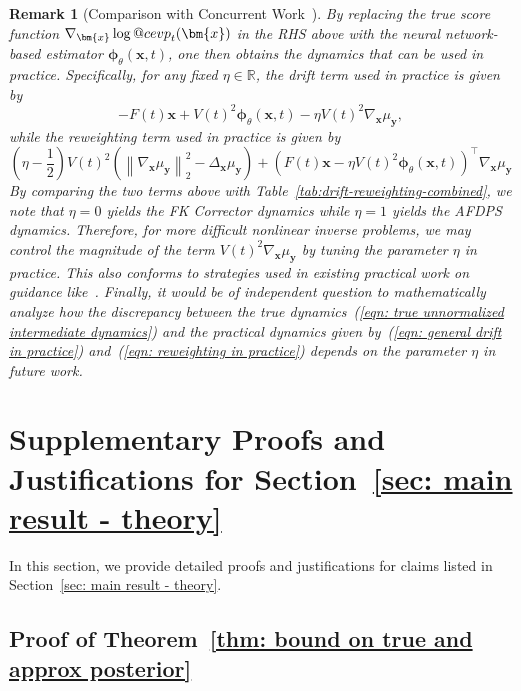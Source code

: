 \documentclass{article}
\makeatletter
\numberwithin{equation}{section}
\newtheorem{remark}[theorem]{Remark}
\def\eqref#1{(\ref{#1})}
\def\vx{{\bm{x}}}
\def\vy{{\bm{y}}}
\def\vphi{{\bm{\phi}}}
\DeclareRobustCommand{\cev}[1]{%
  {\mathpalette\do@cev{#1}}%
}
\newcommand{\do@cev}[2]{%
  \vbox{\offinterlineskip
    \sbox\z@{$\m@th#1 x$}%
    \ialign{##\cr
      \hidewidth\reflectbox{$\m@th#1\vec{}\mkern4mu$}\hidewidth\cr
      \noalign{\kern-\ht\z@}
      $\m@th#1#2$\cr
    }%
  }%
}
\makeatother
\begin{document}
\begin{remark}[Comparison with Concurrent Work~\cite{skreta2025feynman}]
    By replacing the true score function $\nabla_{\vx}\log \cev{p}_t(\vx)$ in the RHS above with the neural network-based estimator $\vphi_{\theta}(\vx,t)$, one then obtains the dynamics that can be used in practice. Specifically, for any fixed $\eta \in \mathbb{R}$, the drift term used in practice is given by
    \begin{equation}
    \label{eqn: general drift in practice}    
    -F(t)\vx + V(t)^2\vphi_{\theta}(\vx,t) - \eta V(t)^2\nabla_{\vx}\mu_{\vy},
    \end{equation}
    while the reweighting term used in practice is given by 
    \begin{equation}
    \label{eqn: reweighting in practice}
    \left(\eta - \frac{1}{2}\right)V(t)^2\left(\left\|\nabla_{\vx}\mu_{\vy}\right\|_2^2 - \Delta_{\vx}\mu_{\vy}\right) + \left(F(t)\vx -\eta V(t)^2 \vphi_{\theta}\left(\vx,t\right)\right)^\intercal\nabla_{\vx}\mu_{\vy} 
    \end{equation}
    By comparing the two terms above with Table~\ref{tab:drift-reweighting-combined}, we note that $\eta = 0$ yields the FK Corrector dynamics while $\eta = 1$ yields the AFDPS dynamics. Therefore, for more difficult nonlinear inverse problems, we may control the magnitude of the term $V(t)^2\nabla_{\vx}\mu_{\vy}$ by tuning the parameter $\eta$ in practice. This also conforms to strategies used in existing practical work on guidance like~\cite{dhariwal2021diffusion,ho2022classifier,bansal2023universal,song2023loss,he2023manifold,guo2024gradient,ye2024tfg}. Finally, it would be of independent question to mathematically analyze how the discrepancy between the true dynamics~\eqref{eqn: true unnormalized intermediate dynamics} and the practical dynamics given by~\eqref{eqn: general drift in practice} and~\eqref{eqn: reweighting in practice} depends on the parameter $\eta$ in future work.
\end{remark}


\section{Supplementary Proofs and Justifications for Section~\ref{sec: main result - theory}}
\label{sec: derivations for Sec 4}
In this section, we provide detailed proofs and justifications for claims listed in Section~\ref{sec: main result - theory}. 

\subsection{Proof of Theorem~\ref{thm: bound on true and approx posterior}}
\label{proof: posterior bound by prior error}
\end{document}

